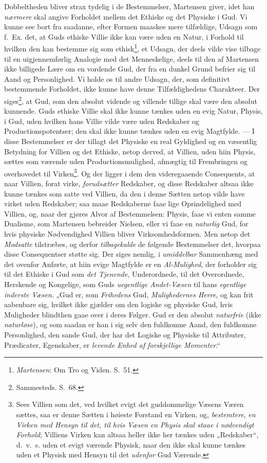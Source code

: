 \documentclass[12pt,a4paper]{book}
\newcommand{\opage}[1]{\marginnote{\footnotesize\textit{[#1]}}}
\begin{document}
\opage{73}Dobbeltheden bliver strax tydelig i de Bestemmelser, Martensen giver, idet han
\emph{nærmere} skal angive Forholdet mellem det Ethiske og det Physiske i Gud. Vi
kunne see bort fra saadanne, efter Formen maaskee mere tilfældige, Udsagn som f.\
Ex. det, at Guds ethiske Villie ikke kan være uden en Natur, i Forhold til hvilken
den kan bestemme sig som ethisk\footnote{\emph{Martensen}: Om Tro og Viden. S.\ 51.}, et
Udsagn, der deels vilde vise tilbage til en uigjennemførlig Analogie med det
Menneskelige, deels til den af Martensen ikke billigede Lære om en vordende Gud, der
fra en dunkel Grund befrier sig til Aand og Personlighed. Vi holde os til andre
Udsagn, der, som definitivt bestemmende Forholdet, ikke kunne have denne
Tilfældighedens Charakteer. Der siges\footnote{Sammesteds. S.\ 68.}, at Gud, som den
absolut vidende og villende tillige skal være den absolut kunnende. Guds ethiske
Villie skal ikke kunne tænkes uden en evig Natur, Physis, i Gud, uden hvilken hans
Villie vilde være uden Redskaber og Productionspotentser; den skal ikke kunne
tænkes uden en evig Magtfylde. --- I disse Bestemmelser er der tillagt det Physiske
en real Gyldighed og en væsentlig Betydning for Villien og det Ethiske, netop
derved, at Villien, uden hiin Physis, sættes som værende uden Productionsmulighed,
afmægtig til Frembringen og overhovedet til Virken\footnote{Sees Villien som det,
ved hvilket evigt det guddommelige Væsens Væren sættes, saa er denne Sætten i
høieste Forstand en Virken, og, \emph{bestemtere}, \emph{en Virken med Hensyn til det, til hvis Væsen en Physis skal staae i nødvendigt Forhold}; Villiens Virken kan altsaa heller
ikke her tænkes uden „Redskaber“, d.\ v.\ s. uden et evigt værende Physisk, naar den
ikke skal kunne tænkes uden et Physisk med Hensyn til det \emph{udenfor} Gud Værende.}. Og
der ligger i dem den videregaaende Consequents, at naar Villien, forat virke,
\emph{forudsætter} Redskaber, og disse Redskaber altsaa ikke kunne tænkes som satte ved
Villien, da den i denne Sætten netop vilde have virket uden Redskaber; saa maae
Redskaberne faae lige Oprindelighed med Villien, og, naar der gjøres Alvor af
Bestemmelsen: Phy\opage{74}sis, faae vi enten samme Dualisme, som Martensen bebreider Nielsen,
eller vi faae en \emph{naturlig} Gud, for hvis physiske Nødvendighed Villien bliver
Virksomhedsformen. Men netop det \emph{Modsatte} tilstræbes, og derfor \emph{tilbagekalde} de
følgende Bestemmelser det, hvorpaa disse Consequentser støtte sig. Der siges nemlig,
i \emph{umiddelbar} Sammenhæng med det ovenfor Anførte, at hiin evige Magtfylde er en \emph{Al-Mulighed}, der forholder sig til det Ethiske i Gud som \emph{det Tjenende},
Underordnede, til det Overordnede, Herskende og Kongelige, som Guds \emph{uegentlige Andet-Væsen} til hans \emph{egentlige inderste Væsen}. „Gud er, som \emph{Frihedens} Gud, \emph{Mulighedernes Herre}, og kan frit aabenbare sig, hvilket ikke gjælder om den logiske
og physiske Gud, hvis Muligheder blindthen gaae over i deres Følger. Gud er den absolut \emph{naturfrie} (ikke \emph{naturløse}), og som saadan er han i sig selv den fuldkomne
Aand, den fuldkomne Personlighed, den sande Gud, der har det Logiske og Physiske til
Attributer, Prædicater, Egenskaber, er \emph{levende Enhed af forskjellige Momenter}.“
\end{document}
